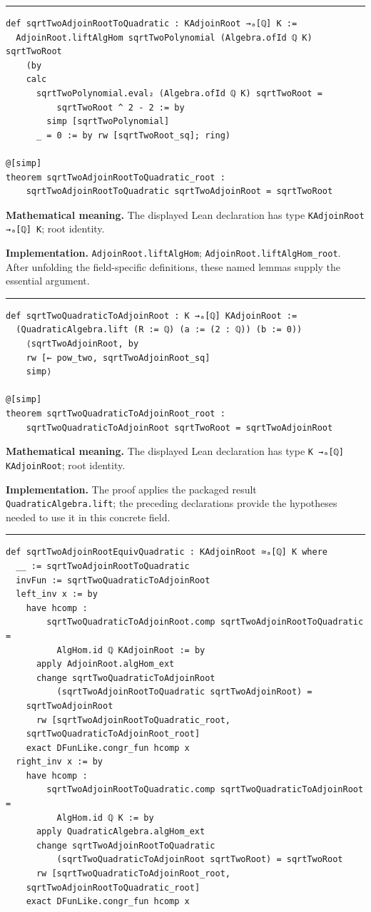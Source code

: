 \documentclass[UTF8,a4paper,11pt,fontset=fandol]{ctexart}
\theoremstyle{definition}
\newcommand{\statementsep}{\par\medskip\hrule\medskip}
\begin{document}
\statementsep
\begin{verbatim}
def sqrtTwoAdjoinRootToQuadratic : KAdjoinRoot →ₐ[ℚ] K :=
  AdjoinRoot.liftAlgHom sqrtTwoPolynomial (Algebra.ofId ℚ K) sqrtTwoRoot
    (by
    calc
      sqrtTwoPolynomial.eval₂ (Algebra.ofId ℚ K) sqrtTwoRoot =
          sqrtTwoRoot ^ 2 - 2 := by
        simp [sqrtTwoPolynomial]
      _ = 0 := by rw [sqrtTwoRoot_sq]; ring)

@[simp]
theorem sqrtTwoAdjoinRootToQuadratic_root :
    sqrtTwoAdjoinRootToQuadratic sqrtTwoAdjoinRoot = sqrtTwoRoot
\end{verbatim}
\noindent\textbf{Mathematical meaning.} The displayed Lean declaration has type \texttt{KAdjoinRoot →ₐ[ℚ] K}; root identity.\par
\noindent\textbf{Implementation.} \texttt{AdjoinRoot.\allowbreak{}liftAlgHom}; \texttt{AdjoinRoot.\allowbreak{}liftAlgHom\_\allowbreak{}root}. After unfolding the field-specific definitions, these named lemmas supply the essential argument.\par
\statementsep
\begin{verbatim}
def sqrtTwoQuadraticToAdjoinRoot : K →ₐ[ℚ] KAdjoinRoot :=
  (QuadraticAlgebra.lift (R := ℚ) (a := (2 : ℚ)) (b := 0))
    ⟨sqrtTwoAdjoinRoot, by
    rw [← pow_two, sqrtTwoAdjoinRoot_sq]
    simp⟩

@[simp]
theorem sqrtTwoQuadraticToAdjoinRoot_root :
    sqrtTwoQuadraticToAdjoinRoot sqrtTwoRoot = sqrtTwoAdjoinRoot
\end{verbatim}
\noindent\textbf{Mathematical meaning.} The displayed Lean declaration has type \texttt{K →ₐ[ℚ] KAdjoinRoot}; root identity.\par
\noindent\textbf{Implementation.} The proof applies the packaged result \texttt{QuadraticAlgebra.\allowbreak{}lift}; the preceding declarations provide the hypotheses needed to use it in this concrete field.\par
\statementsep
\begin{verbatim}
def sqrtTwoAdjoinRootEquivQuadratic : KAdjoinRoot ≃ₐ[ℚ] K where
  __ := sqrtTwoAdjoinRootToQuadratic
  invFun := sqrtTwoQuadraticToAdjoinRoot
  left_inv x := by
    have hcomp :
        sqrtTwoQuadraticToAdjoinRoot.comp sqrtTwoAdjoinRootToQuadratic =
          AlgHom.id ℚ KAdjoinRoot := by
      apply AdjoinRoot.algHom_ext
      change sqrtTwoQuadraticToAdjoinRoot
          (sqrtTwoAdjoinRootToQuadratic sqrtTwoAdjoinRoot) =
    sqrtTwoAdjoinRoot
      rw [sqrtTwoAdjoinRootToQuadratic_root,
    sqrtTwoQuadraticToAdjoinRoot_root]
    exact DFunLike.congr_fun hcomp x
  right_inv x := by
    have hcomp :
        sqrtTwoAdjoinRootToQuadratic.comp sqrtTwoQuadraticToAdjoinRoot =
          AlgHom.id ℚ K := by
      apply QuadraticAlgebra.algHom_ext
      change sqrtTwoAdjoinRootToQuadratic
          (sqrtTwoQuadraticToAdjoinRoot sqrtTwoRoot) = sqrtTwoRoot
      rw [sqrtTwoQuadraticToAdjoinRoot_root,
    sqrtTwoAdjoinRootToQuadratic_root]
    exact DFunLike.congr_fun hcomp x
\end{verbatim}
\end{document}

